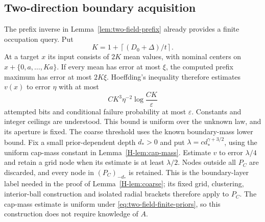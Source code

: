 \subsection{Two-direction boundary acquisition}
The prefix inverse in Lemma~\ref{lem:two-field-prefix} already provides
a finite occupation query.  Put
\[
 K=1+\left\lceil (D_0+\Delta)/t\right\rceil.
\]
At a target $x$ its input consists of $2K$ mean values, with nominal
centers on $x+\{0,a,\ldots,Ka\}$.  If every mean has error at most
$\xi$, the computed prefix maximum has error at most $2K\xi$.
Hoeffding's inequality therefore estimates $v(x)$ to error $\eta$
with at most
\begin{equation}\label{eq:two-field-occupation-cost}
 C K^3\eta^{-2}\log\frac{CK}{\varepsilon}
\end{equation}
attempted bits and conditional failure probability at most
$\varepsilon$.  Constants and integer ceilings are understood.
This bound is uniform over the unknown law, and its aperture is fixed.
The coarse threshold uses the known boundary-mass lower bound.
Fix a small prior-dependent depth $d_*>0$ and put
$\lambda=c d_*^{\gamma+3/2}$, using the uniform cap-mass constant
in Lemma~\ref{H-lem:cap-mass}.  Estimate $v$ to error
$\lambda/4$ and retain a grid node when its estimate is at least
$\lambda/2$.  Nodes outside all $P_C$ are discarded, and every
node in $(P_C)_{-d_*}$ is retained.  This is the boundary-layer label
needed in the proof of Lemma~\ref{H-lem:coarse}; its fixed grid,
clustering, interior-ball construction and isolated radial brackets
therefore apply to $P_C$.  The cap-mass estimate is uniform under
\eqref{eq:two-field-finite-priors}, so this construction does not
require knowledge of $A$.

